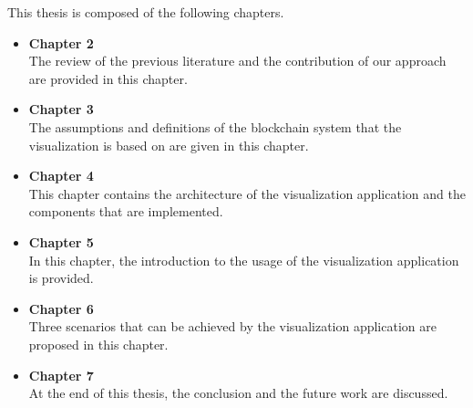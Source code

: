 This thesis is composed of the following chapters.

\begin{itemize}
    \item \textbf{Chapter 2} \\
        The review of the previous literature and the contribution of our approach are provided in this chapter.
    \item \textbf{Chapter 3} \\
        The assumptions and definitions of the blockchain system that the visualization is based on are given in this chapter.
    \item \textbf{Chapter 4} \\
        This chapter contains the architecture of the visualization application and the components that are implemented.
    \item \textbf{Chapter 5} \\
        In this chapter, the introduction to the usage of the visualization application is provided.
    \item \textbf{Chapter 6} \\
        Three scenarios that can be achieved by the visualization application are proposed in this chapter.
    \item \textbf{Chapter 7} \\
        At the end of this thesis, the conclusion and the future work are discussed.
\end{itemize}

